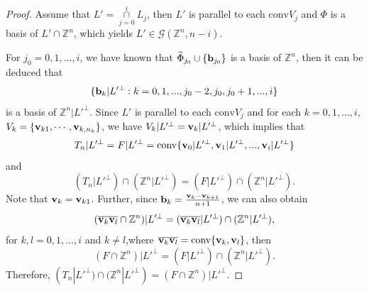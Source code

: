 \documentclass[10pt,a4paper]{amsart}
\begin{document}
\begin{proof}
Assume that $L'=\underset{j=0}{\overset{i}{\cap}}L_j$, then $L'$ is parallel to each $\mathrm{conv}V_j$ and $\Phi$ is a basis of $L'\cap\mathbb{Z}^n$, which yields $L'\in\mathcal{G}(\mathbb{Z}^n,n-i)$. 

For $j_0=0,1,...,i$, we have known that $\widetilde{\Phi}_{j_0}\cup\{{\bf b}_{j_0}\}$ is a basis of $\mathbb{Z}^n$, then it can be deduced that $$\{{\bf b}_k|L'^\perp:k=0,1,...,j_0-2,j_0,j_0+1,...,i\}$$ is a basis of $\mathbb{Z}^n|L'^\perp$. Since $L'$ is parallel to each $\mathrm{conv}V_j$ and for each $k=0,1,...,i$, $V_k=\{{\bf v}_{k1},\cdots,{\bf v}_{k,n_k}\}$, we have $V_k|L'^\perp={\bf v}_k|L'^\perp$, which implies that
$$T_n|L'^\perp=F|L'^\perp=\mathrm{conv}\{{\bf v}_0|L'^\perp, {\bf v}_1|L'^\perp, ..., {\bf v}_i|L'^\perp\}$$
and
$$(T_n|L'^\perp)\cap(\mathbb{Z}^n|L'^\perp)=(F|L'^\perp)\cap(\mathbb{Z}^n|L'^\perp).$$ Note that ${\bf v}_k={\bf v}_{k1}$. Further, since ${\bf b}_k=\frac{{\bf v}_k-{\bf v}_{k+1}}{n+1}$, we can also obtain
$$(\overline{{\bf v}_k{\bf v}_l}\cap\mathbb{Z}^n)|L'^\perp=(\overline{{\bf v}_k{\bf v}_l}|L'^\perp)\cap(\mathbb{Z}^n|L'^\perp),$$
for $k,l=0,1,...,i$ and $k\not=l$,where $\overline{{\bf v}_k{\bf v}_l}=\text{conv}\{{\bf v}_k,{\bf v}_l\}$, then
$$(F\cap\mathbb{Z}^n)|L'^\perp=(F|L'^\perp)\cap(\mathbb{Z}^n|L'^\perp).$$ 
Therefore,  $(T_n|L'^\perp)\cap(\mathbb{Z}^n|L'^\perp)=(F\cap\mathbb{Z}^n)|L'^\perp$.



\end{proof}
\end{document}
